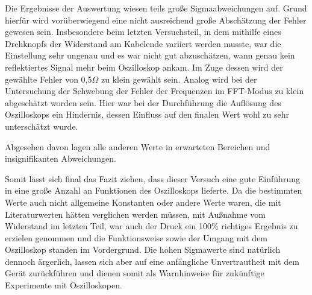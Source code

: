 \documentclass{article}
\begin{document}
Die Ergebnisse der Auswertung wiesen teils große Sigmaabweichungen auf. Grund hierfür wird vorüberwiegend eine nicht ausreichend große Abschätzung der Fehler gewesen sein. Insbesondere beim letzten Versuchsteil, in dem mithilfe eines Drehknopfs der Widerstand am Kabelende variiert werden musste, war die Einstellung sehr ungenau und es war nicht gut abzuschätzen, wann genau kein reflektiertes Signal mehr beim Oszilloskop ankam. Im Zuge dessen wird der gewählte Fehler von 0,5$\Omega$ zu klein gewählt sein. Analog wird bei der Untersuchung der Schwebung der Fehler der Frequenzen im FFT-Modus zu klein abgeschätzt worden sein. Hier war bei der Durchführung die Auflösung des Oszilloskops ein Hindernis, dessen Einfluss auf den finalen Wert wohl zu sehr unterschätzt wurde.

Abgesehen davon lagen alle anderen Werte in erwarteten Bereichen und insignifikanten Abweichungen. 

Somit lässt sich final das Fazit ziehen, dass dieser Versuch eine gute Einführung in eine große Anzahl an Funktionen des Oszilloskops lieferte. Da die bestimmten Werte auch nicht allgemeine Konstanten oder andere Werte waren, die mit Literaturwerten hätten verglichen werden müssen, mit Außnahme vom Widerstand im letzten Teil, war auch der Druck ein 100\% richtiges Ergebnis zu erzielen genommen und die Funktionsweise sowie der Umgang mit dem Oszilloskop standen im Vordergrund. Die hohen Sigmawerte sind natürlich dennoch ärgerlich, lassen sich aber auf eine anfängliche Unvertrautheit mit dem Gerät zurückführen und dienen somit als Warnhinweise für zukünftige Experimente mit Oszilloskopen. 
\end{document}
